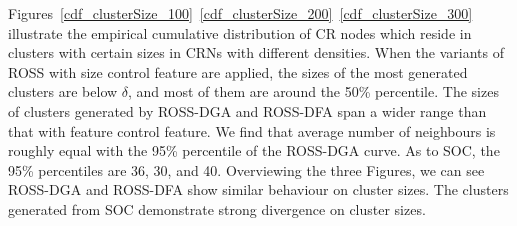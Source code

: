 \documentclass[10pt,journal,compsoc]{IEEEtran}
\theoremstyle{mytheoremstyle}
\theoremstyle{mytheoremstyle}
\theoremstyle{mytheoremstyle}
\begin{document}

Figures~\ref{cdf_clusterSize_100}~\ref{cdf_clusterSize_200}~\ref{cdf_clusterSize_300} illustrate the empirical cumulative distribution of CR nodes which reside in clusters with certain sizes in CRNs with different densities.
When the variants of ROSS with size control feature are applied, the sizes of the most generated clusters are below $\delta$, and most of them are around the 50\% percentile.
The sizes of clusters generated by ROSS-DGA and ROSS-DFA span a wider range than that with feature control feature.
We find that average number of neighbours is roughly equal with the 95\% percentile of the ROSS-DGA curve.
As to SOC, the 95\% percentiles are 36, 30, and 40.
Overviewing the three Figures, we can see ROSS-DGA and ROSS-DFA show similar behaviour on cluster sizes.
The clusters generated from SOC demonstrate strong divergence on cluster sizes.
\end{document}
